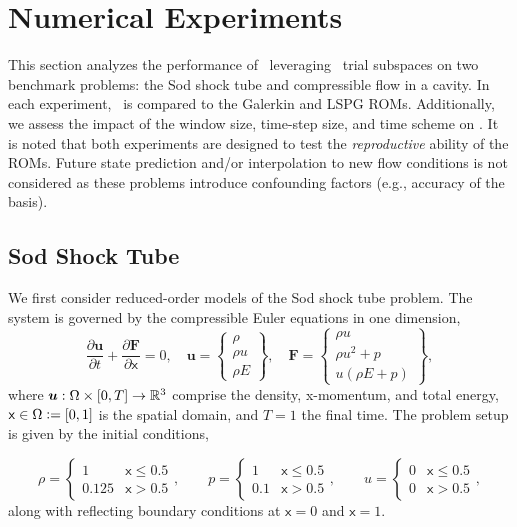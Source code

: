 \section{Numerical Experiments}\label{sec:numerical_experiments}
This section analyzes the performance of \methodAcronymROMs\ leveraging \spatialAcronym\ trial subspaces on two benchmark problems: the Sod shock tube and compressible flow in a cavity. In each experiment, \methodAcronym\ is compared to the Galerkin and LSPG ROMs. Additionally, we assess the impact of the window size, time-step size, and time scheme on \methodAcronym. It is noted that both experiments are designed to test the \textit{reproductive} ability of the ROMs. Future state prediction and/or interpolation to new flow conditions is not considered as these problems introduce confounding factors (e.g., accuracy of the basis). 
 
\subsection{Sod Shock Tube}
We first consider reduced-order models of the Sod shock tube problem. The system is governed by the compressible Euler equations in one dimension, 
\begin{equation}\label{eq:euler_1D}
    \frac{\partial \boldsymbol u}{\partial t} + \frac{\partial \boldsymbol F}{\partial \mathsf{x}} = 0, \quad
    \boldsymbol u= 
    \begin{Bmatrix} \rho \\ \rho u \\ \rho E \end{Bmatrix}, \quad 
    \boldsymbol F = \begin{Bmatrix} \rho u \\ \rho u^2 + p \\  u(\rho E + p) \end{Bmatrix},
\end{equation}
where $\boldsymbol u : \Omega \times [0,T] \rightarrow \mathbb{R}^{3}$ comprise the density, x-momentum, and total energy, $\mathsf{x} \in \Omega \vcentcolon=  [0,1]$ is the spatial domain, and 
$T = 1$ the final time. 
The problem setup is given by the initial conditions,

\begin{equation*}
\rho = 
\begin{cases} 
      1 & \mathsf{x}\leq 0.5 \\
      0.125 & \mathsf{x} > 0.5 
   \end{cases},
\qquad
p = 
\begin{cases} 
      1 & \mathsf{x}\leq 0.5 \\
      0.1 & \mathsf{x} > 0.5 
   \end{cases},
\qquad
u = 
\begin{cases} 
      0 & \mathsf{x}\leq 0.5 \\
      0 & \mathsf{x} > 0.5 
   \end{cases},
\end{equation*}
along with reflecting boundary conditions at $\mathsf{x}=0$ and $\mathsf{x}=1$. 

